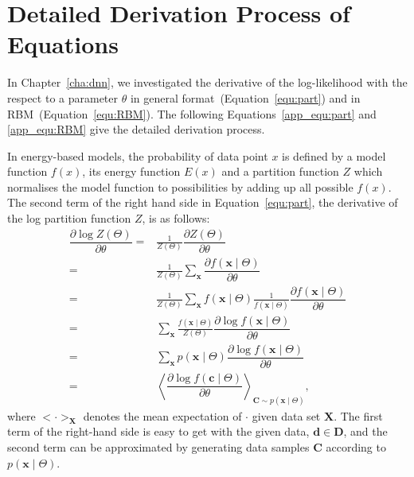 
\chapter{Detailed Derivation Process of Equations}

In Chapter~\ref{cha:dnn}, we investigated the derivative of the log-likelihood with the respect to a parameter $\theta$ in general format~(Equation~\ref{equ:part}) and in RBM~(Equation~\ref{equ:RBM}).
The following Equations~\ref{app_equ:part} and \ref{app_equ:RBM} give the detailed derivation process.

In energy-based models, the probability of data point $x$ is defined by a model function $f(x)$, its energy function $E(x)$ and a partition function $Z$ which normalises the model function to possibilities by adding up all possible $f(x)$.
The second term of the right hand side in Equation~\ref{equ:part}, the derivative of the log partition function $Z$, is as follows:
\begin{equation}
\begin{aligned}
\dfrac{\partial \log Z(\Theta)}{\partial \theta}
=&\frac{1}{Z(\Theta)}\dfrac{\partial Z(\Theta)}{\partial \theta}\\
=&\frac{1}{Z(\Theta)} \sum_{\textbf{x}} \dfrac{\partial f(\mathbf{x} \mid \Theta)}{\partial \theta} \\
=&\frac{1}{Z(\Theta)}  \sum_{\textbf{x}} f(\mathbf{x} \mid \Theta) \frac{1}{f(\mathbf{x} \mid \Theta)} \dfrac{\partial  f(\mathbf{x} \mid \Theta)}{\partial \theta} \\
=&  \sum_{\textbf{x}} \frac{f(\mathbf{x} \mid \Theta) }{Z(\Theta)} \dfrac{\partial \log f(\mathbf{x} \mid \Theta)}{\partial \theta} \\
=&  \sum_{\textbf{x}}  p(\mathbf{x} \mid \Theta) \dfrac{\partial \log f(\mathbf{x} \mid \Theta)}{\partial \theta} \\
=&\left \langle \dfrac{\partial \log f(\mathbf{c} \mid \Theta)}{\partial \theta}\right \rangle_{\mathbf{C} \sim p(\mathbf{x} \mid \Theta)},
\end{aligned}
\label{app_equ:part}
\end{equation}
where $ <\cdot>_{\mathbf{X}} $ denotes the mean expectation of $ \cdot $ given data set $\mathbf{X}$.
The first term of the right-hand side is easy to get with the given data, $\mathbf{d} \in \mathbf{D} $, and the second term can be approximated by generating data samples $\mathbf{C} $ according to $ p(\mathbf{x} \mid \Theta) $.

